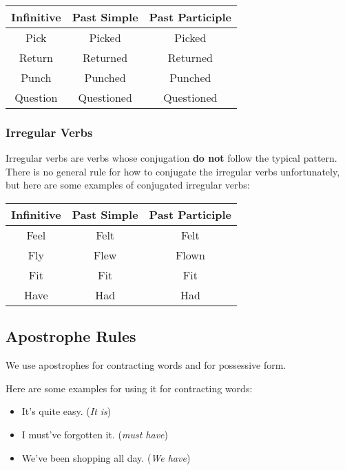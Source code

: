 \begin{center}
    \begin{tabular}{|c|c|c|}
        \hline
        Infinitive & Past Simple & Past Participle \\
        \hline
        \hline
        Pick & Picked & Picked \\
        \hline 
        Return & Returned & Returned \\
        \hline 
        Punch & Punched & Punched \\
        \hline 
        Question & Questioned & Questioned \\
        \hline 
    \end{tabular}
\end{center}

\subsubsection{Irregular Verbs}
Irregular verbs are verbs whose conjugation \textbf{do not} follow the typical pattern. There is no general rule for how to conjugate the irregular verbs unfortunately, but here are some examples of conjugated irregular verbs:

\begin{center}
    \begin{tabular}{|c|c|c|}
        \hline
        Infinitive & Past Simple & Past Participle \\
        \hline
        \hline
        Feel & Felt & Felt \\
        \hline 
        Fly & Flew & Flown \\
        \hline 
        Fit & Fit & Fit \\
        \hline 
        Have & Had & Had \\
        \hline 
    \end{tabular}
\end{center}

\newpage
\subsection{Apostrophe Rules}
We use apostrophes for contracting words and for possessive form.

Here are some examples for using it for contracting words:

\begin{itemize}
    \item It's quite easy. (\textit{It is})
    \item I must've forgotten it. (\textit{must have})
    \item We've been shopping all day. (\textit{We have})
\end{itemize}

